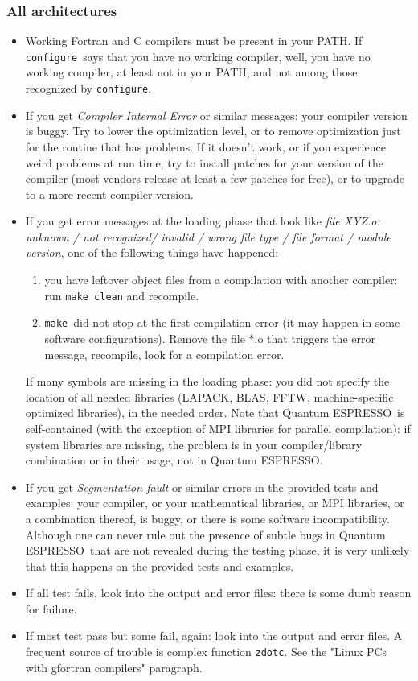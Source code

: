 \documentclass[12pt,a4paper]{article}
\def\qe{{\sc Quantum ESPRESSO}}
\def\configure{\texttt{configure}}
\def\make{\texttt{make}}
\begin{document}
\subsubsection{All architectures}
\begin{itemize}
\item
Working Fortran and C compilers must be present in your PATH.
If \configure\ says that you have no working compiler, well,
you have no working compiler, at least not in your PATH, and
not among those recognized by \configure.
\item
If you get {\em Compiler Internal Error} or similar messages: your
compiler version is buggy. Try to lower the optimization level, or to
remove optimization just for the routine that has problems. If it
doesn't work, or if you experience weird problems at run time, try to
install patches for your version of the compiler (most vendors release
at least a few patches for free), or to upgrade to a more recent
compiler version.
\item
If you get error messages at the loading phase that look like
{\em file XYZ.o: unknown / not recognized/ invalid / wrong
file type / file format / module version},
one of the following things have happened:
\begin{enumerate}
\item you have leftover object files from a compilation with another
  compiler: run \texttt{make clean} and recompile.
\item \make\ did not stop at the first compilation error (it may
happen in some software configurations). Remove the file *.o
that triggers the error message, recompile, look for a
compilation error.
\end{enumerate}
If many symbols are missing in the loading phase: you did not specify the
location of all needed libraries (LAPACK, BLAS, FFTW, machine-specific
optimized libraries), in the needed order.
Note that \qe\ is self-contained (with the exception of MPI libraries for
parallel compilation): if system libraries are missing, the problem is in
your compiler/library combination or in their usage, not in \qe.
\item
If you get {\em Segmentation fault} or similar errors
in the provided tests and examples: your compiler, or
your mathematical libraries, or MPI libraries,
or a combination thereof, is buggy, or there is some
software incompatibility. Although one can never rule out
the presence of subtle bugs in \qe\ that are not revealed during
the testing phase, it is very unlikely
that this happens on the provided tests and examples.
\item
If all test fails, look into the output and error files:
there is some dumb reason for failure.
\item
If most test pass but some fail, again: look into the output
and error files. A frequent source of trouble is complex function
\texttt{zdotc}. See the "Linux PCs with gfortran compilers" paragraph.
\end{itemize}
\end{document}
